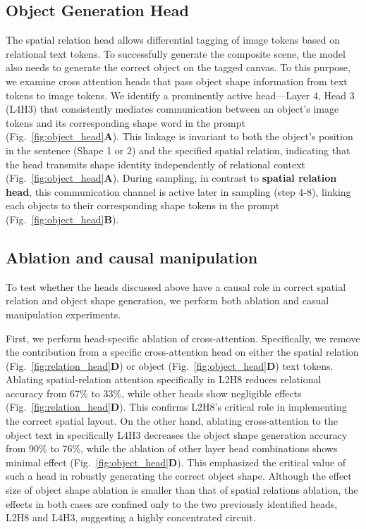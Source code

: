 \documentclass[10pt,twocolumn,letterpaper]{article}
\begin{document}
\subsection{Object Generation Head}
The spatial relation head allows differential tagging of image tokens based on relational text tokens. To successfully generate the composite scene, the model also needs to generate the correct object on the tagged canvas. To this purpose, we examine cross attention heads that pass object shape information from text tokens to image tokens. We identify a prominently active head—Layer 4, Head 3 (L4H3) that consistently mediates communication between an object’s image tokens and its corresponding shape word in the prompt (Fig.~\ref{fig:object_head}\textbf{A}). This linkage is invariant to both the object’s position in the sentence (Shape 1 or 2) and the specified spatial relation, indicating that the head transmits shape identity independently of relational context (Fig.~\ref{fig:object_head}\textbf{A}). %
During sampling, in contrast to \textbf{spatial relation head}, this communication channel is active later in sampling (step 4-8), linking each objects to their corresponding shape tokens in the prompt (Fig.~\ref{fig:object_head}\textbf{B}).  %

\subsection{Ablation and causal manipulation} 
To test whether the heads discussed above have a causal role in correct spatial relation and object shape generation, we perform both ablation and casual manipulation experiments.  

First, we perform head-specific ablation of cross-attention. Specifically, we remove the contribution from a specific cross-attention head on either the spatial relation (Fig.~\ref{fig:relation_head}\textbf{D}) or object (Fig.~\ref{fig:object_head}\textbf{D}) text tokens. Ablating spatial-relation attention specifically in L2H8 reduces relational accuracy from 67\% to 33\%, while other heads show negligible effects (Fig.~\ref{fig:relation_head}\textbf{D}). 
This confirms L2H8’s critical role in implementing the correct spatial layout. On the other hand, ablating cross-attention to the object text in specifically L4H3 decreases the object shape generation accuracy from 90\% to 76\%, while the ablation of other layer head combinations shows minimal effect (Fig.~\ref{fig:object_head}\textbf{D}). This emphasized the critical value of such a head in robustly generating the correct object shape. Although the effect size of object shape ablation is smaller than that of spatial relations ablation, the effects in both cases are confined only to the two previously identified heads, L2H8 and L4H3, suggesting a highly concentrated circuit.
\end{document}
